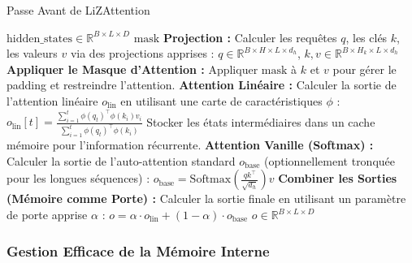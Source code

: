 \documentclass[10pt,a4paper]{article}
\begin{document}
\begin{algorithm}[H]
\caption{Passe Avant de LiZAttention}
\label{alg:lizattention}
\begin{algorithmic}[1]
\Require $\text{hidden\_states} \in \mathbb{R}^{B \times L \times D}$ 
\Require $\text{mask}$ 
\State \textbf{Projection :}
    \Statex \hspace{1em} Calculer les requêtes $q$, les clés $k$, les valeurs $v$ via des projections apprises :
    \Statex \hspace{1em} $q \in \mathbb{R}^{B \times H \times L \times d_h}$, $k, v \in \mathbb{R}^{B \times H_k \times L \times d_h}$
\State \textbf{Appliquer le Masque d'Attention :}
    \Statex \hspace{1em} Appliquer $\text{mask}$ à $k$ et $v$ pour gérer le padding et restreindre l'attention.
\State \textbf{Attention Linéaire :}
    \Statex \hspace{1em} Calculer la sortie de l'attention linéaire $o_{\mathrm{lin}}$ en utilisant une carte de caractéristiques $\phi$ :
    \Statex \hspace{1em} $o_{\mathrm{lin}}[t] = \frac{\sum_{i=1}^{t} \phi(q_t)^\top \phi(k_i) v_i}{\sum_{i=1}^{t} \phi(q_t)^\top \phi(k_i)}$
    \Statex \hspace{1em} Stocker les états intermédiaires dans un cache mémoire pour l'information récurrente.
\State \textbf{Attention Vanille (Softmax) :}
    \Statex \hspace{1em} Calculer la sortie de l'auto-attention standard $o_{\mathrm{base}}$ (optionnellement tronquée pour les longues séquences) :
    \Statex \hspace{1em} $o_{\mathrm{base}} = \text{Softmax}\left(\frac{q k^\top}{\sqrt{d_h}}\right) v$
\State \textbf{Combiner les Sorties (Mémoire comme Porte) :}
    \Statex \hspace{1em} Calculer la sortie finale en utilisant un paramètre de porte apprise $\alpha$ :
    \Statex \hspace{1em} $o = \alpha \cdot o_{\mathrm{lin}} + (1-\alpha) \cdot o_{\mathrm{base}}$
\State \Return $o \in \mathbb{R}^{B \times L \times D}$
\end{algorithmic}
\end{algorithm}

\subsubsection{Gestion Efficace de la Mémoire Interne}
\end{document}
